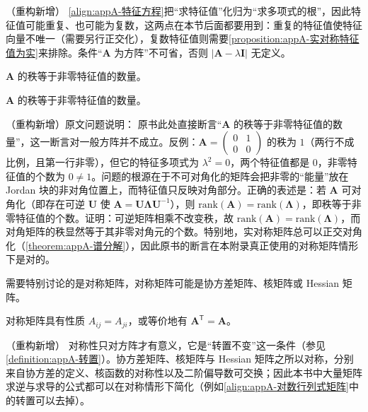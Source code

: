\documentclass[../main.tex]{subfiles}
\begin{document}
\begin{remark}（重构新增）
\eqref{align:appA-特征方程}把“求特征值”化归为“求多项式的根”，因此特征值可能重复、也可能为复数，这两点在本节后面都要用到：重复的特征值使特征向量不唯一（需要另行正交化），复数特征值则需要\cref{proposition:appA-实对称特征值为实}来排除。条件“$\bm{A}$ 为方阵”不可省，否则 $|\bm{A}-\lambda\bm{I}|$ 无定义。
\end{remark}

$\bm{A}$ 的秩等于非零特征值的数量。

\begin{proposition}[秩与非零特征值的个数]\label{proposition:appA-秩与非零特征值}
$\bm{A}$ 的秩等于非零特征值的数量。
\end{proposition}

\begin{remark}（重构新增）原文问题说明：
原书此处直接断言“$\bm{A}$ 的秩等于非零特征值的数量”，这一断言对一般方阵并不成立。反例：$\bm{A}=\begin{pmatrix}0&1\\0&0\end{pmatrix}$ 的秩为 $1$（两行不成比例，且第一行非零），但它的特征多项式为 $\lambda^{2}=0$，两个特征值都是 $0$，非零特征值的个数为 $0\neq1$。问题的根源在于不可对角化的矩阵会把非零的“能量”放在 Jordan 块的非对角位置上，而特征值只反映对角部分。正确的表述是：若 $\bm{A}$ 可对角化（即存在可逆 $\bm{U}$ 使 $\bm{A}=\bm{U}\bm{\Lambda}\bm{U}^{-1}$），则 $\mathrm{rank}(\bm{A})=\mathrm{rank}(\bm{\Lambda})$，即秩等于非零特征值的个数。证明：可逆矩阵相乘不改变秩，故 $\mathrm{rank}(\bm{A})=\mathrm{rank}(\bm{\Lambda})$，而对角矩阵的秩显然等于其非零对角元的个数。特别地，实对称矩阵总可以正交对角化（\cref{theorem:appA-谱分解}），因此原书的断言在本附录真正使用的对称矩阵情形下是对的。
\end{remark}

需要特别讨论的是对称矩阵，对称矩阵可能是协方差矩阵、核矩阵或 Hessian 矩阵。

\begin{definition}[对称矩阵]\label{definition:appA-对称矩阵}
对称矩阵具有性质 $A_{ij}=A_{ji}$，或等价地有 $\bm{A}^{\mathsf{T}}=\bm{A}$。
\end{definition}

\begin{remark}（重构新增）
对称性只对方阵才有意义，它是“转置不变”这一条件（参见\cref{definition:appA-转置}）。协方差矩阵、核矩阵与 Hessian 矩阵之所以对称，分别来自协方差的定义、核函数的对称性以及二阶偏导数可交换；因此本书中大量矩阵求逆与求导的公式都可以在对称情形下简化（例如\eqref{align:appA-对数行列式矩阵}中的转置可以去掉）。
\end{remark}
\end{document}
